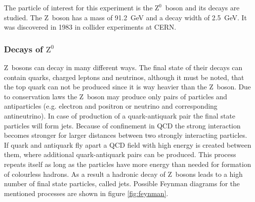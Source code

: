 \documentclass[11pt, a4paper]{article}
\numberwithin{equation}{section}
\begin{document}
The particle of interest for this experiment is the $\mathrm{Z}^0$~boson and its decays are studied.
The Z~boson has a mass of \SI{91.2}{GeV} and a decay width of \SI{2.5}{GeV}.
It was discovered in 1983 in collider experiments at CERN.

\subsubsection{Decays of $\mathrm{Z}^0$}

Z~bosons can decay in many different ways.
The final state of their decays can contain quarks, charged leptons and neutrinos, although it must be noted, that the top quark can not be produced since it is way heavier than the Z~boson.
Due to conservation laws the Z~boson may produce only pairs of particles and antiparticles (e.g. electron and positron or neutrino and corresponding antineutrino).
In case of production of a quark-antiquark pair the final state particles will form jets.
Because of confinement in QCD the strong interaction becomes stronger for larger distances between two strongly interacting particles.
If quark and antiquark fly apart a QCD field with high energy is created between them, where additional quark-antiquark pairs can be produced.
This process repeats itself as long as the particles have more energy than needed for formation of colourless hadrons.
As a result a hadronic decay of Z~bosons leads to a high number of final state particles, called jets.
Possible Feynman diagrams for the mentioned processes are shown in figure \ref{fig:feynman}.
\end{document}
